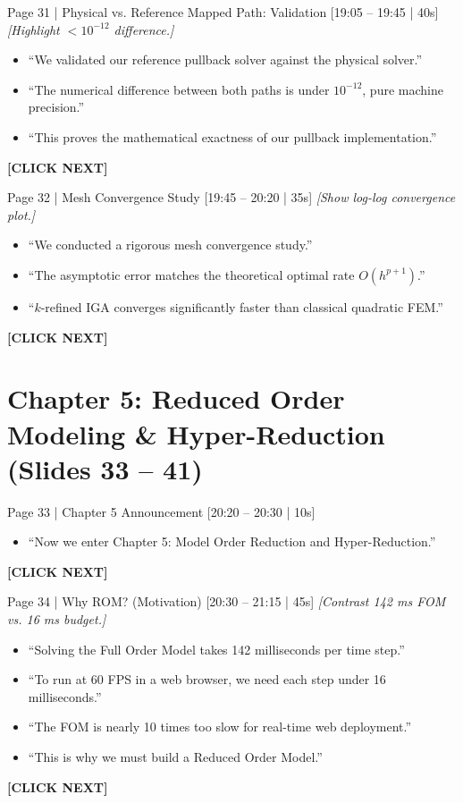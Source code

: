 \documentclass[9pt,a4paper]{article}
\begin{document}
\begin{slidebox}{Page 31 | Physical vs. Reference Mapped Path: Validation \hfill [19:05 -- 19:45 | 40s]}
\textit{[Highlight $< 10^{-12}$ difference.]}
\begin{itemize}
  \item ``We validated our reference pullback solver against the physical solver.''
  \item ``The numerical difference between both paths is under $10^{-12}$, pure machine precision.''
  \item ``This proves the mathematical exactness of our pullback implementation.''
\end{itemize}
\textbf{\color{cnamred}[CLICK NEXT]}
\end{slidebox}

\begin{slidebox}{Page 32 | Mesh Convergence Study \hfill [19:45 -- 20:20 | 35s]}
\textit{[Show log-log convergence plot.]}
\begin{itemize}
  \item ``We conducted a rigorous mesh convergence study.''
  \item ``The asymptotic error matches the theoretical optimal rate $O(h^{p+1})$.''
  \item ``$k$-refined IGA converges significantly faster than classical quadratic FEM.''
\end{itemize}
\textbf{\color{cnamred}[CLICK NEXT]}
\end{slidebox}

\section*{Chapter 5: Reduced Order Modeling \& Hyper-Reduction (Slides 33 -- 41)}

\begin{slidebox}{Page 33 | Chapter 5 Announcement \hfill [20:20 -- 20:30 | 10s]}
\begin{itemize}
  \item ``Now we enter Chapter 5: Model Order Reduction and Hyper-Reduction.''
\end{itemize}
\textbf{\color{cnamred}[CLICK NEXT]}
\end{slidebox}

\begin{slidebox}{Page 34 | Why ROM? (Motivation) \hfill [20:30 -- 21:15 | 45s]}
\textit{[Contrast 142 ms FOM vs. 16 ms budget.]}
\begin{itemize}
  \item ``Solving the Full Order Model takes 142 milliseconds per time step.''
  \item ``To run at 60 FPS in a web browser, we need each step under 16 milliseconds.''
  \item ``The FOM is nearly 10 times too slow for real-time web deployment.''
  \item ``This is why we must build a Reduced Order Model.''
\end{itemize}
\textbf{\color{cnamred}[CLICK NEXT]}
\end{slidebox}
\end{document}
